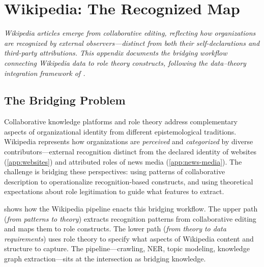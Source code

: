 \documentclass[../main.tex]{subfiles}
\begin{document}

\chapter{Wikipedia: The Recognized Map}
\label{app:wikipedia}

\noindent\textit{Wikipedia articles emerge from collaborative editing, reflecting how organizations are \emph{recognized}
by external observers---distinct from both their self-declarations and third-party attributions.
This appendix documents the bridging workflow connecting Wikipedia data to role theory constructs,
following the data--theory integration framework of \textcite{maass2018data}.}

\bigskip


\section{The Bridging Problem}

Collaborative knowledge platforms and role theory address complementary aspects
of organizational identity from different epistemological traditions.
Wikipedia represents how organizations are \emph{perceived} and \emph{categorized}
by diverse contributors---external recognition distinct from the declared
identity of websites (\cref{app:websites}) and attributed roles of news media
(\cref{app:news-media}).
The challenge is bridging these perspectives: using patterns of collaborative
description to operationalize recognition-based constructs, and using
theoretical expectations about role legitimation to guide what features to extract.

 shows how the \RoleBox{} Wikipedia pipeline
enacts this bridging workflow.
The upper path (\textit{from patterns to theory}) extracts recognition patterns
from collaborative editing and maps them to role constructs.
The lower path (\textit{from theory to data requirements}) uses role theory
to specify what aspects of Wikipedia content and structure to capture.
The pipeline---crawling, NER, topic modeling, knowledge graph extraction---sits
at the intersection as bridging knowledge.
\end{document}
